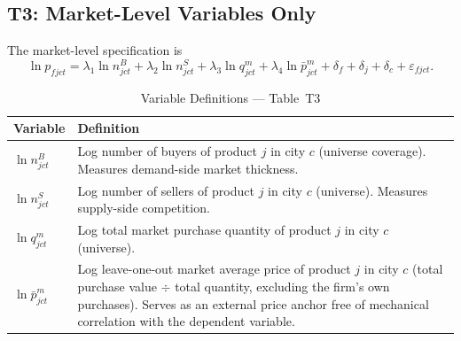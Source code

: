 \documentclass[12pt]{article}
\begin{document}
\subsection{T3: Market-Level Variables Only}
\label{sec:t3}

The market-level specification is
\begin{equation}
  \ln p_{fjct}
  = \lambda_1 \ln n^{B}_{jct}
  + \lambda_2 \ln n^{S}_{jct}
  + \lambda_3 \ln q^{m}_{jct}
  + \lambda_4 \ln \bar{p}^{m}_{jct}
  + \delta_f + \delta_j + \delta_c
  + \varepsilon_{fjct}.
  \label{eq:t3}
\end{equation}

\begin{table}[H]
  \centering
  \caption{Variable Definitions --- Table~T3}
  \label{tab:vardef_t3}
  \begin{tabular}{L{3.5cm} L{10.5cm}}
    \toprule
    Variable & Definition \\
    \midrule
    \(\ln n^{B}_{jct}\) &
      Log number of buyers of product \(j\) in city \(c\) (universe
      coverage). Measures demand-side market thickness. \\[4pt]
    \(\ln n^{S}_{jct}\) &
      Log number of sellers of product \(j\) in city \(c\) (universe).
      Measures supply-side competition. \\[4pt]
    \(\ln q^{m}_{jct}\) &
      Log total market purchase quantity of product \(j\) in city \(c\)
      (universe). \\[4pt]
    \(\ln \bar{p}^{m}_{jct}\) &
      Log leave-one-out market average price of product \(j\) in city \(c\)
      (total purchase value \(\div\) total quantity, excluding the firm's own
      purchases). Serves as an external price anchor free of mechanical
      correlation with the dependent variable. \\
    \bottomrule
  \end{tabular}
\end{table}
\end{document}
